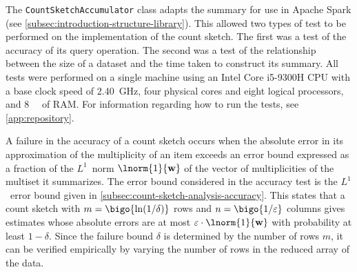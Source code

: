 The \lstinline{CountSketchAccumulator} class adapts the summary for use in Apache Spark (see \cref{subsec:introduction-structure-library}).
This allowed two types of test to be performed on the implementation of the count sketch.
The first was a test of the accuracy of its query operation.
The second was a test of the relationship between the size of a dataset and the time taken to construct its summary.
All tests were performed on a single machine using an Intel Core i5-9300H CPU with a base clock speed of \SI{2.40}{\giga\hertz}, four physical cores and eight logical processors, and \SI{8}{\gibi\byte} of RAM\@.
For information regarding how to run the tests, see \cref{app:repository}.

A failure in the accuracy of a count sketch occurs when the absolute error in its approximation of the multiplicity of an item exceeds an error bound expressed as a fraction of the \( L^{1} \)~norm \( \lnorm{1}{\mathvector{w}} \) of the vector of multiplicities of the multiset it summarizes.
The error bound considered in the accuracy test is the \( L^{1} \)~error bound given in \cref{subsec:count-sketch-analysis-accuracy}.
This states that a count sketch with \( m = \bigo{\ln (1 / \delta)} \) rows and \( n = \bigo{1 / \varepsilon} \) columns gives estimates whose absolute errors are at most \( \varepsilon \cdot \lnorm{1}{\mathvector{w}} \) with probability at least \( 1 - \delta \).
Since the failure bound \( \delta \) is determined by the number of rows \( m \), it can be verified empirically by varying the number of rows in the reduced array of the data.

